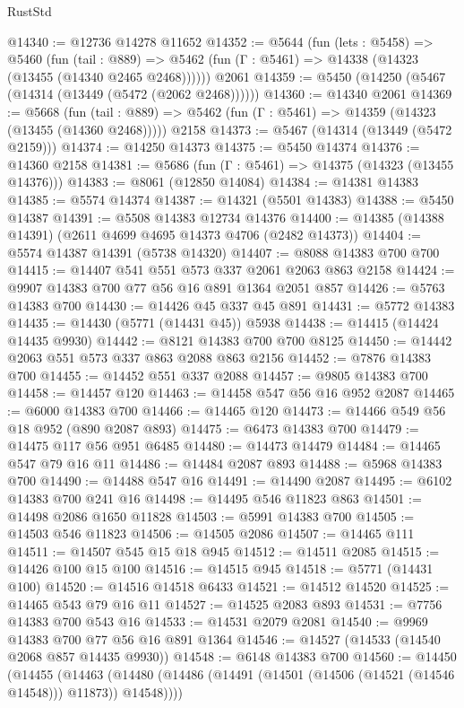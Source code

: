 \begin{lexlean}{RustStd}
\begin{coremodule}
@14340 := @12736 @14278 @11652
@14352 := @5644
    (fun (lets : @5458) =>
    @5460
      (fun (tail : @889) =>
      @5462 (fun (Γ : @5461) => @14338 (@14323 (@13455 (@14340 @2465 @2468))))))
    @2061
@14359 := @5450 (@14250 (@5467 (@14314 (@13449 (@5472 (@2062 @2468))))))
@14360 := @14340 @2061
@14369 := @5668
    (fun (tail : @889) => @5462 (fun (Γ : @5461) => @14359 (@14323 (@13455 (@14360 @2468)))))
    @2158
@14373 := @5467 (@14314 (@13449 (@5472 @2159)))
@14374 := @14250 @14373
@14375 := @5450 @14374
@14376 := @14360 @2158
@14381 := @5686 (fun (Γ : @5461) => @14375 (@14323 (@13455 @14376)))
@14383 := @8061 (@12850 @14084)
@14384 := @14381 @14383
@14385 := @5574 @14374
@14387 := @14321 (@5501 @14383)
@14388 := @5450 @14387
@14391 := @5508 @14383 @12734 @14376
@14400 := @14385 (@14388 @14391) (@2611 @4699 @4695 @14373 @4706 (@2482 @14373))
@14404 := @5574 @14387 @14391 (@5738 @14320)
@14407 := @8088 @14383 @700 @700
@14415 := @14407 @541 @551 @573 @337 @2061 @2063 @863 @2158
@14424 := @9907 @14383 @700 @77 @56 @16 @891 @1364 @2051 @857
@14426 := @5763 @14383 @700
@14430 := @14426 @45 @337 @45 @891
@14431 := @5772 @14383
@14435 := @14430 (@5771 (@14431 @45)) @5938
@14438 := @14415 (@14424 @14435 @9930)
@14442 := @8121 @14383 @700 @700 @8125
@14450 := @14442 @2063 @551 @573 @337 @863 @2088 @863 @2156
@14452 := @7876 @14383 @700
@14455 := @14452 @551 @337 @2088
@14457 := @9805 @14383 @700
@14458 := @14457 @120
@14463 := @14458 @547 @56 @16 @952 @2087
@14465 := @6000 @14383 @700
@14466 := @14465 @120
@14473 := @14466 @549 @56 @18 @952 (@890 @2087 @893)
@14475 := @6473 @14383 @700
@14479 := @14475 @117 @56 @951 @6485
@14480 := @14473 @14479
@14484 := @14465 @547 @79 @16 @11
@14486 := @14484 @2087 @893
@14488 := @5968 @14383 @700
@14490 := @14488 @547 @16
@14491 := @14490 @2087
@14495 := @6102 @14383 @700 @241 @16
@14498 := @14495 @546 @11823 @863
@14501 := @14498 @2086 @1650 @11828
@14503 := @5991 @14383 @700
@14505 := @14503 @546 @11823
@14506 := @14505 @2086
@14507 := @14465 @111
@14511 := @14507 @545 @15 @18 @945
@14512 := @14511 @2085
@14515 := @14426 @100 @15 @100
@14516 := @14515 @945
@14518 := @5771 (@14431 @100)
@14520 := @14516 @14518 @6433
@14521 := @14512 @14520
@14525 := @14465 @543 @79 @16 @11
@14527 := @14525 @2083 @893
@14531 := @7756 @14383 @700 @543 @16
@14533 := @14531 @2079 @2081
@14540 := @9969 @14383 @700 @77 @56 @16 @891 @1364
@14546 := @14527 (@14533 (@14540 @2068 @857 @14435 @9930))
@14548 := @6148 @14383 @700
@14560 := @14450
    (@14455
      (@14463 (@14480 (@14486 (@14491 (@14501 (@14506 (@14521 (@14546 @14548))) @11873)) @14548))))

\end{coremodule}
\end{lexlean}
